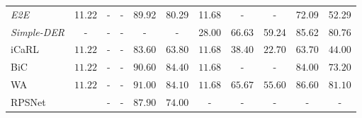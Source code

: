 \begin{table*}[t]
\begin{tabular}{l|ccccc|ccccc}
        \textit{E2E} \cite{castro2018end_to_end_inc_learn}       & 11.22                                     & -                                         & -                                   & 89.92                           & 80.29                              & 11.68                              & -                       & -                       & 72.09                   & 52.29                   \\
        \textit{Simple-DER} \cite{li2021preserve}                & -                                         & -                                         & -                                   & -                               & -                                  & 28.00                              & 66.63                   & 59.24                   & 85.62                   & 80.76                   \\
        iCaRL \cite{rebuffi2017icarl}                            & $11.22$                                   & -                                         & -                                   & $83.60$                         & $63.80$                            & $11.68$                            & $38.40$                 & $22.70$                 & $63.70$                 & $44.00$                 \\
        BiC \cite{hou2019ucir}                                   & $11.22$                                   & -                                         & -                                   & $90.60$                         & $84.40$                            & $11.68$                            & -                       & -                       & $84.00$                 & $73.20$                 \\
        WA \cite{zhao2020weightalignement}                       & $11.22$                                   & -                                         & -                                   & $91.00$                         & $84.10$                            & $11.68$                            & $65.67$                 & $55.60$                 & $86.60$                 & $81.10$                 \\
        RPSNet \cite{rajasegaran2019rpsnet}                      &                                           & -                                         & -                                   & $87.90$                         & $74.00$                            & -                                  & -                       & -                       & -                       & -                       \\

\end{tabular}
\end{table*}
